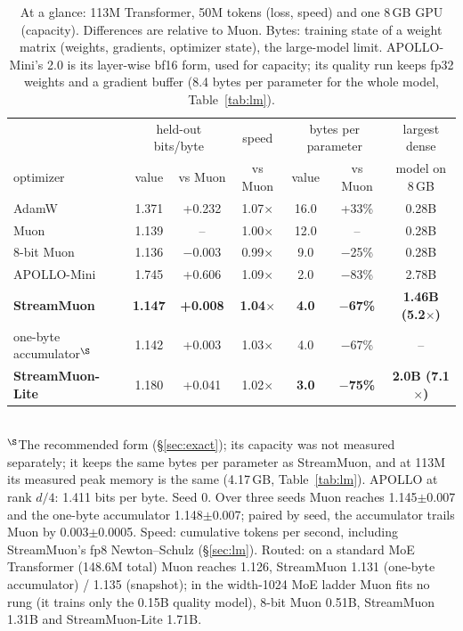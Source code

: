 \documentclass[10pt]{article}
\newcommand{\method}{StreamMuon}\newcommand{\lite}{StreamMuon-Lite}
\begin{document}
\begin{table}[!tb]
\centering\small
\caption{At a glance: 113M Transformer, 50M tokens (loss, speed) and one 8\,GB GPU (capacity). Differences are
relative to Muon. Bytes: training state of a weight matrix (weights, gradients, optimizer state), the large-model limit.
APOLLO-Mini's 2.0 is its layer-wise bf16 form, used for capacity; its quality run keeps fp32 weights and a gradient
buffer (8.4 bytes per parameter for the whole model, Table~\ref{tab:lm}).}
\label{tab:glance}
\setlength{\tabcolsep}{4.5pt}
\begin{tabular}{lcccccc}
\toprule
& \multicolumn{2}{c}{held-out bits/byte} & speed & \multicolumn{2}{c}{bytes per parameter} & largest dense \\
optimizer & value & vs Muon & vs Muon & value & vs Muon & model on 8\,GB \\
\midrule
AdamW & 1.371 & +0.232 & 1.07$\times$ & 16.0 & +33\% & 0.28B \\
Muon & 1.139 & -- & 1.00$\times$ & 12.0 & -- & 0.28B \\
8-bit Muon & 1.136 & $-$0.003 & 0.99$\times$ & 9.0 & $-$25\% & 0.28B \\
APOLLO-Mini & 1.745 & +0.606 & 1.09$\times$ & 2.0 & $-$83\% & 2.78B \\
\rowcolor{ours!12} \textbf{\method{}} & \textbf{1.147} & \textbf{+0.008} & \textbf{1.04$\times$} & \textbf{4.0} & \textbf{$-$67\%} & \textbf{1.46B (5.2$\times$)} \\
\rowcolor{ours!12} \quad one-byte accumulator$^\S$ & 1.142 & +0.003 & 1.03$\times$ & 4.0 & $-$67\% & -- \\
\rowcolor{ours!12} \textbf{\lite{}} & 1.180 & +0.041 & 1.02$\times$ & \textbf{3.0} & \textbf{$-$75\%} & \textbf{2.0B (7.1$\times$)} \\
\bottomrule
\end{tabular}\\[2pt]
{\footnotesize $^\S$The recommended form (\S\ref{sec:exact}); its capacity was not measured separately; it keeps the same bytes per
parameter as \method{}, and at 113M its measured peak memory is the same (4.17\,GB, Table~\ref{tab:lm}). APOLLO at rank $d/4$: 1.411 bits per byte. Seed 0. Over three seeds Muon reaches 1.145$\pm$0.007 and the one-byte accumulator 1.148$\pm$0.007; paired by seed, the accumulator trails Muon by 0.003$\pm$0.0005. Speed: cumulative tokens per second, including StreamMuon's fp8 Newton--Schulz (\S\ref{sec:lm}). Routed: on a standard MoE Transformer (148.6M total) Muon reaches 1.126,
\method{} 1.131 (one-byte accumulator) / 1.135 (snapshot); in the width-1024 MoE ladder Muon fits no rung (it trains only the 0.15B quality
model), 8-bit Muon 0.51B, \method{} 1.31B and \lite{} 1.71B.}
\end{table}
\end{document}

